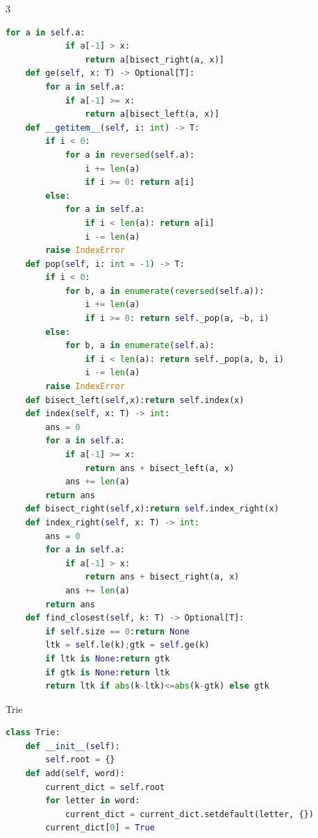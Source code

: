 \documentclass[10pt,landscape, a4paper]{article}
\begin{document}
\begin{multicols*}{3}
\begin{lstlisting}[language=Python]
        for a in self.a:
            if a[-1] > x:
                return a[bisect_right(a, x)]
    def ge(self, x: T) -> Optional[T]:
        for a in self.a:
            if a[-1] >= x:
                return a[bisect_left(a, x)]
    def __getitem__(self, i: int) -> T:
        if i < 0:
            for a in reversed(self.a):
                i += len(a)
                if i >= 0: return a[i]
        else:
            for a in self.a:
                if i < len(a): return a[i]
                i -= len(a)
        raise IndexError
    def pop(self, i: int = -1) -> T:
        if i < 0:
            for b, a in enumerate(reversed(self.a)):
                i += len(a)
                if i >= 0: return self._pop(a, ~b, i)
        else:
            for b, a in enumerate(self.a):
                if i < len(a): return self._pop(a, b, i)
                i -= len(a)
        raise IndexError
    def bisect_left(self,x):return self.index(x)
    def index(self, x: T) -> int:
        ans = 0
        for a in self.a:
            if a[-1] >= x:
                return ans + bisect_left(a, x)
            ans += len(a)
        return ans
    def bisect_right(self,x):return self.index_right(x)
    def index_right(self, x: T) -> int:
        ans = 0
        for a in self.a:
            if a[-1] > x:
                return ans + bisect_right(a, x)
            ans += len(a)
        return ans
    def find_closest(self, k: T) -> Optional[T]:
        if self.size == 0:return None
        ltk = self.le(k);gtk = self.ge(k)
        if ltk is None:return gtk
        if gtk is None:return ltk
        return ltk if abs(k-ltk)<=abs(k-gtk) else gtk
\end{lstlisting}

Trie
\begin{lstlisting}[language=Python]
class Trie:
    def __init__(self):
        self.root = {}
    def add(self, word):
        current_dict = self.root
        for letter in word:
            current_dict = current_dict.setdefault(letter, {})
        current_dict[0] = True
\end{lstlisting}


\end{multicols*}
\end{document}

